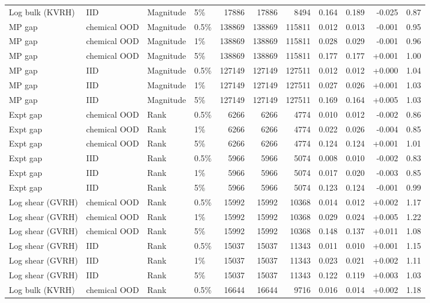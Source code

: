\begin{tabular}{llllrrrrrrr}
Log bulk (KVRH) & IID & Magnitude & 5\% & 17886 & 17886 & 8494 & 0.164 & 0.189 & -0.025 & 0.87 \\
MP gap & chemical OOD & Magnitude & 0.5\% & 138869 & 138869 & 115811 & 0.012 & 0.013 & -0.001 & 0.95 \\
MP gap & chemical OOD & Magnitude & 1\% & 138869 & 138869 & 115811 & 0.028 & 0.029 & -0.001 & 0.96 \\
MP gap & chemical OOD & Magnitude & 5\% & 138869 & 138869 & 115811 & 0.177 & 0.177 & +0.001 & 1.00 \\
MP gap & IID & Magnitude & 0.5\% & 127149 & 127149 & 127511 & 0.012 & 0.012 & +0.000 & 1.04 \\
MP gap & IID & Magnitude & 1\% & 127149 & 127149 & 127511 & 0.027 & 0.026 & +0.001 & 1.03 \\
MP gap & IID & Magnitude & 5\% & 127149 & 127149 & 127511 & 0.169 & 0.164 & +0.005 & 1.03 \\
Expt gap & chemical OOD & Rank & 0.5\% & 6266 & 6266 & 4774 & 0.010 & 0.012 & -0.002 & 0.86 \\
Expt gap & chemical OOD & Rank & 1\% & 6266 & 6266 & 4774 & 0.022 & 0.026 & -0.004 & 0.85 \\
Expt gap & chemical OOD & Rank & 5\% & 6266 & 6266 & 4774 & 0.124 & 0.124 & +0.001 & 1.01 \\
Expt gap & IID & Rank & 0.5\% & 5966 & 5966 & 5074 & 0.008 & 0.010 & -0.002 & 0.83 \\
Expt gap & IID & Rank & 1\% & 5966 & 5966 & 5074 & 0.017 & 0.020 & -0.003 & 0.85 \\
Expt gap & IID & Rank & 5\% & 5966 & 5966 & 5074 & 0.123 & 0.124 & -0.001 & 0.99 \\
Log shear (GVRH) & chemical OOD & Rank & 0.5\% & 15992 & 15992 & 10368 & 0.014 & 0.012 & +0.002 & 1.17 \\
Log shear (GVRH) & chemical OOD & Rank & 1\% & 15992 & 15992 & 10368 & 0.029 & 0.024 & +0.005 & 1.22 \\
Log shear (GVRH) & chemical OOD & Rank & 5\% & 15992 & 15992 & 10368 & 0.148 & 0.137 & +0.011 & 1.08 \\
Log shear (GVRH) & IID & Rank & 0.5\% & 15037 & 15037 & 11343 & 0.011 & 0.010 & +0.001 & 1.15 \\
Log shear (GVRH) & IID & Rank & 1\% & 15037 & 15037 & 11343 & 0.023 & 0.021 & +0.002 & 1.11 \\
Log shear (GVRH) & IID & Rank & 5\% & 15037 & 15037 & 11343 & 0.122 & 0.119 & +0.003 & 1.03 \\
Log bulk (KVRH) & chemical OOD & Rank & 0.5\% & 16644 & 16644 & 9716 & 0.016 & 0.014 & +0.002 & 1.18 \\

\end{tabular}
